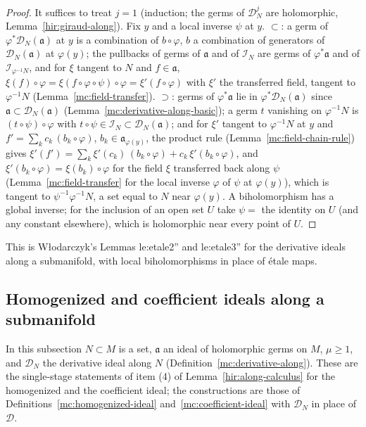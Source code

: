 \begin{proof}
\leanok
It suffices to treat \(j=1\) (induction; the germs of \(\mathcal D_N^j\) are holomorphic, Lemma~\ref{hir:giraud-along}). Fix \(y\) and a local inverse \(\psi\) at \(y\).
\(\subset\): a germ of \(\varphi^*\mathcal D_N(\mathfrak a)\) at \(y\) is a combination of \(b\circ\varphi\), \(b\) a combination of generators of \(\mathcal D_N(\mathfrak a)\) at
\(\varphi(y)\); the pullbacks of germs of \(\mathfrak a\) and of \(\mathcal I_N\) are germs of \(\varphi^*\mathfrak a\) and of \(\mathcal I_{\varphi^{-1}N}\), and for \(\xi\) tangent to \(N\) and
\(f\in\mathfrak a\), \(\xi(f)\circ\varphi=\xi(f\circ\varphi\circ\psi)\circ\varphi=\xi'(f\circ\varphi)\) with \(\xi'\) the transferred field, tangent to \(\varphi^{-1}N\)
(Lemma~\ref{mc:field-transfer}). \(\supset\): germs of \(\varphi^*\mathfrak a\) lie in \(\varphi^*\mathcal D_N(\mathfrak a)\) since \(\mathfrak a\subset\mathcal D_N(\mathfrak a)\)
(Lemma~\ref{mc:derivative-along-basic}); a germ \(t\) vanishing on \(\varphi^{-1}N\) is \((t\circ\psi)\circ\varphi\) with \(t\circ\psi\in\mathcal I_N\subset\mathcal D_N(\mathfrak a)\); and
for \(\xi'\) tangent to \(\varphi^{-1}N\) at \(y\) and \(f'=\sum_kc_k\,(b_k\circ\varphi)\), \(b_k\in\mathfrak a_{\varphi(y)}\), the product rule (Lemma~\ref{mc:field-chain-rule}) gives
\(\xi'(f')=\sum_k\xi'(c_k)\,(b_k\circ\varphi)+c_k\,\xi'(b_k\circ\varphi)\), and \(\xi'(b_k\circ\varphi)=\xi(b_k)\circ\varphi\) for the field \(\xi\) transferred back along \(\psi\)
(Lemma~\ref{mc:field-transfer} for the local inverse \(\varphi\) of \(\psi\) at \(\varphi(y)\)), which is tangent to \(\psi^{-1}\varphi^{-1}N\), a set equal to \(N\) near
\(\varphi(y)\). A biholomorphism has a global inverse; for the inclusion of an open set \(U\) take \(\psi=\) the identity on \(U\) (and any constant elsewhere), which
is holomorphic near every point of \(U\).
\end{proof}
This is Włodarczyk's Lemmas le:etale2'' and le:etale3'' for the derivative ideals along a submanifold, with local biholomorphisms in place of étale maps.

\subsection{Homogenized and coefficient ideals along a submanifold}

In this subsection \(N\subset M\) is a set, \(\mathfrak a\) an ideal of holomorphic germs on \(M\), \(\mu\ge1\), and \(\mathcal D_N\) the derivative ideal along \(N\)
(Definition~\ref{mc:derivative-along}). These are the single-stage statements of item (4) of Lemma~\ref{hir:along-calculus} for the homogenized and the
coefficient ideal; the constructions are those of Definitions~\ref{mc:homogenized-ideal} and~\ref{mc:coefficient-ideal} with \(\mathcal D_N\) in place of \(\mathcal D\).

